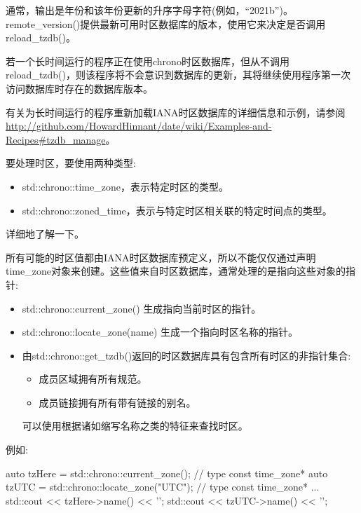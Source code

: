 通常，输出是年份和该年份更新的升序字母字符(例如，“2021b”)。remote\_version()提供最新可用时区数据库的版本，使用它来决定是否调用reload\_tzdb()。

若一个长时间运行的程序正在使用chrono时区数据库，但从不调用reload\_tzdb()，则该程序将不会意识到数据库的更新，其将继续使用程序第一次访问数据库时存在的数据库版本。

有关为长时间运行的程序重新加载IANA时区数据库的详细信息和示例，请参阅\url{http://github.com/HowardHinnant/date/wiki/Examples-and-Recipes#tzdb_manage}。


要处理时区，要使用两种类型:

\begin{itemize}
\item
std::chrono::time\_zone，表示特定时区的类型。

\item
std::chrono::zoned\_time，表示与特定时区相关联的特定时间点的类型。
\end{itemize}

详细地了解一下。


所有可能的时区值都由IANA时区数据库预定义，所以不能仅仅通过声明time\_zone对象来创建。这些值来自时区数据库，通常处理的是指向这些对象的指针:

\begin{itemize}
\item
std::chrono::current\_zone() 生成指向当前时区的指针。

\item
std::chrono::locate\_zone(name) 生成一个指向时区名称的指针。

\item
由std::chrono::get\_tzdb()返回的时区数据库具有包含所有时区的非指针集合:

\begin{itemize}
\item
成员区域拥有所有规范。

\item
成员链接拥有所有带有链接的别名。
\end{itemize}

可以使用根据诸如缩写名称之类的特征来查找时区。
\end{itemize}

例如:

\begin{cpp}
auto tzHere = std::chrono::current_zone(); // type const time_zone*
auto tzUTC = std::chrono::locate_zone("UTC"); // type const time_zone*
...
std::cout << tzHere->name() << '\n';
std::cout << tzUTC->name() << '\n';
\end{cpp}

